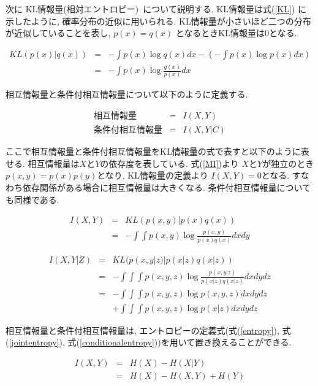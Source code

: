 \documentclass[a4paper]{jarticle}
\begin{document}
次に KL情報量(相対エントロピー)~\cite{Meyer}について説明する. KL情報量は式(\ref{KL}) に示したように, 確率分布の近似に用いられる. KL情報量が小さいほど二つの分布が近似していることを表し, $p(x) = q(x)$ となるときKL情報量は$0$となる.

\begin{eqnarray}
\label{KL}
KL(p(x) | q(x)) &=& - \int p(x) \log q(x) dx - \left(- \int p(x) \log p(x) dx \right) \nonumber \\ 
                    &=& - \int p(x) \log \frac{q(x)}{p(x)} dx
\end{eqnarray}

相互情報量と条件付相互情報量について以下のように定義する.

\begin{eqnarray*}
\mbox{相互情報量} &=& I(X, Y) \\
\mbox{条件付相互情報量} &=& I(X, Y | C)
\end{eqnarray*}

ここで相互情報量と条件付相互情報量をKL情報量の式で表すと以下のように表せる. 相互情報量は$X$と$Y$の依存度を表している. 式(\ref{MI})より $X$と$Y$が独立のとき$p(x, y) = p(x) p(y)$となり, KL情報量の定義より $I(X, Y) = 0$となる. すなわち依存関係がある場合に相互情報量は大きくなる. 条件付相互情報量についても同様である. 

\begin{eqnarray}
\label{MI}
I(X, Y) &=& KL(p(x, y) | p(x) q(x)) \nonumber \\
          &=& - \int \int p(x, y) \log \frac{p(x, y)}{p(x) q(x)} dx dy 
\end{eqnarray}

\begin{eqnarray}
\label{CMI}
I(X, Y | Z) &=&  KL(p(x, y| z) | p(x|z) q(x|z)) \nonumber \\
              &=& - \int \int \int p(x, y, z) \log \frac{p(x, y|z)}{p(x|z) q(x|z)} dx dy dz \nonumber \\
               &=& - \int \int \int p(x, y, z) \log p(x, y, z) dx dy dz  \nonumber \\
                &&+ \int \int \int p(x, y, z) \log p(x| z) dx dy dz 
\end{eqnarray}

相互情報量と条件付相互情報量は, エントロピーの定義式(式(\ref{entropy}), 式(\ref{jointentropy}), 式(\ref{conditionalentropy}))を用いて置き換えることができる.  

\begin{eqnarray}
\label{MIentropy}
I(X, Y) &=& H(X) - H(X|Y) \nonumber \\
         &=& H(X) - H(X, Y) + H(Y)
\end{eqnarray}
\end{document}
